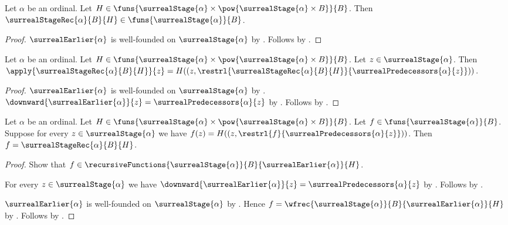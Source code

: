 \begin{theorem}\label{surreal_stage_recursion_type}
    Let $\alpha$ be an ordinal.
    Let $H\in\funs{
        \surrealStage{\alpha}\times
            \pow{\surrealStage{\alpha}\times B}}{B}$.
    Then $\surrealStageRec{\alpha}{B}{H}\in
        \funs{\surrealStage{\alpha}}{B}$.
\end{theorem}
\begin{proof}
    $\surrealEarlier{\alpha}$ is well-founded on
        $\surrealStage{\alpha}$
        by .
    Follows by .
\end{proof}

\begin{theorem}\label{surreal_stage_recursion_equation}
    Let $\alpha$ be an ordinal.
    Let $H\in\funs{
        \surrealStage{\alpha}\times
            \pow{\surrealStage{\alpha}\times B}}{B}$.
    Let $z\in\surrealStage{\alpha}$.
    Then
        $\apply{\surrealStageRec{\alpha}{B}{H}}{z}=
            H((z,\restrl{\surrealStageRec{\alpha}{B}{H}}
                {\surrealPredecessors{\alpha}{z}}))$.
\end{theorem}
\begin{proof}
    $\surrealEarlier{\alpha}$ is well-founded on
        $\surrealStage{\alpha}$
        by .
    $\downward{\surrealEarlier{\alpha}}{z}=
        \surrealPredecessors{\alpha}{z}$
        by .
    Follows by .
\end{proof}

\begin{theorem}\label{surreal_stage_recursion_unique}
    Let $\alpha$ be an ordinal.
    Let $H\in\funs{
        \surrealStage{\alpha}\times
            \pow{\surrealStage{\alpha}\times B}}{B}$.
    Let $f\in\funs{\surrealStage{\alpha}}{B}$.
    Suppose for every $z\in\surrealStage{\alpha}$ we have
        $f(z)=H((z,\restrl{f}{\surrealPredecessors{\alpha}{z}}))$.
    Then $f=\surrealStageRec{\alpha}{B}{H}$.
\end{theorem}
\begin{proof}
    Show that $f\in\recursiveFunctions
        {\surrealStage{\alpha}}{B}{\surrealEarlier{\alpha}}{H}$.
    \begin{subproof}
        For every $z\in\surrealStage{\alpha}$ we have
            $\downward{\surrealEarlier{\alpha}}{z}=
                \surrealPredecessors{\alpha}{z}$
            by .
        Follows by .
    \end{subproof}
    $\surrealEarlier{\alpha}$ is well-founded on
        $\surrealStage{\alpha}$
        by .
    Hence $f=\wfrec{\surrealStage{\alpha}}{B}
        {\surrealEarlier{\alpha}}{H}$
        by .
    Follows by .
\end{proof}


